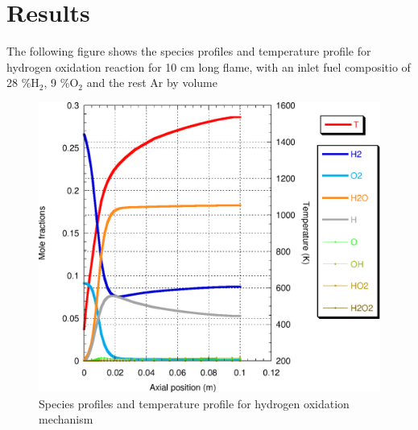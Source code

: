 \section{Results}
The following figure shows the species profiles and temperature profile for hydrogen oxidation reaction for 10 cm long flame, with an inlet fuel compositio of 28 \%H$_2$, 9 \%O$_2$ and the rest Ar by volume
\begin{figure}[h]
 \centering
\includegraphics[scale=0.7]{premix_profile.eps}
\caption{Species profiles and temperature profile for hydrogen oxidation mechanism}
\end{figure}


%
%
%

